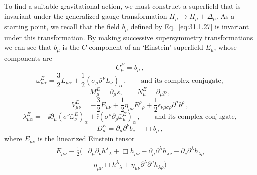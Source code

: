 To find a suitable gravitational action, we must construct a superfield that
is invariant under the generalized gauge transformation
\(H_\mu\to H_\mu+\Delta_\mu\). As a starting point, we recall that the field
\(b_\mu\) defined by Eq.~\eqref{eq:31.1.27} is invariant under this
transformation. By making successive supersymmetry transformations we can see
that \(b_\mu\) is the \(C\)-component of an `Einstein' superfield \(E_\mu\),
whose components are
\begin{equation}
  C_\mu^E=b_\mu\,,
  \tag{31.2.1}\label{eq:31.2.1}
\end{equation}
\begin{equation}
  \omega_{\mu\alpha}^E
  =\frac32L_{\mu\alpha}
   +\frac12(\sigma_\mu\bar\sigma^\nu L_\nu)_\alpha\,,
  \qquad\text{and its complex conjugate},
  \tag{31.2.2}\label{eq:31.2.2}
\end{equation}
\begin{equation}
  M_\mu^E=\partial_\mu s,\qquad
  N_\mu^E=\partial_\mu p\,,
  \tag{31.2.3}\label{eq:31.2.3}
\end{equation}
\begin{equation}
  V_{\mu\nu}^E
  =-\frac32E_{\mu\nu}
   +\frac12\eta_{\mu\nu}E^\rho{}_\rho
   +\frac12\epsilon_{\nu\mu\sigma\rho}\partial^\sigma b^\rho\,,
  \tag{31.2.4}\label{eq:31.2.4}
\end{equation}
\begin{equation}
  \lambda_{\mu\alpha}^E
  =-\ii\partial_\mu
     (\sigma^\nu\bar\omega_\nu^E)_\alpha
   +\ii(\sigma^\rho\partial_\rho\bar\omega_\mu^E)_\alpha\,,
  \qquad\text{and its complex conjugate},
  \tag{31.2.5}\label{eq:31.2.5}
\end{equation}
\begin{equation}
  D_\mu^E=\partial_\mu\partial^\nu b_\nu-\Box b_\mu\,,
  \tag{31.2.6}\label{eq:31.2.6}
\end{equation}
where \(E_{\mu\nu}\) is the linearized Einstein tensor
\begin{equation}
  \begin{aligned}
  E_{\mu\nu}\equiv\frac12\bigl(
    &\partial_\mu\partial_\nu h^\lambda{}_\lambda
     +\Box h_{\mu\nu}
     -\partial_\mu\partial^\lambda h_{\lambda\nu}
     -\partial_\nu\partial^\lambda h_{\lambda\mu}
  \\
    &-\eta_{\mu\nu}\Box h^\lambda{}_\lambda
     +\eta_{\mu\nu}\partial^\lambda\partial^\rho h_{\lambda\rho}
  \bigr)
  \end{aligned}
  \tag{31.2.7}\label{eq:31.2.7}
\end{equation}
